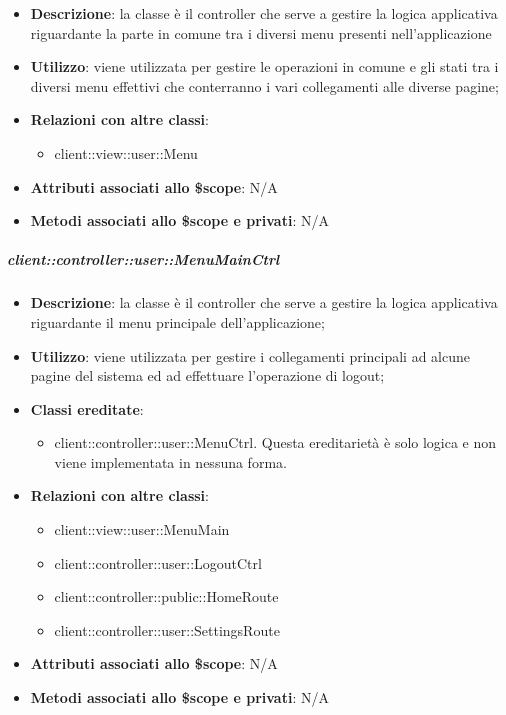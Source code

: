 			\begin{itemize}
				\item \textbf{Descrizione}: la classe è il controller che serve a gestire la logica applicativa riguardante la parte in comune tra i diversi menu presenti nell'applicazione
				\item \textbf{Utilizzo}: viene utilizzata per gestire le operazioni in comune e gli stati tra i diversi menu effettivi che conterranno i vari collegamenti alle diverse pagine;
				\item \textbf{Relazioni con altre classi}:
					\begin{itemize}
						\item client::view::user::Menu
					\end{itemize}
				\item \textbf{Attributi associati allo \$scope}: N/A
				\item \textbf{Metodi associati allo \$scope e privati}: N/A
			\end{itemize}

		\subparagraph{client::controller::user::MenuMainCtrl} %
		\label{subp:client_controller_user_menumainctrl}

			\begin{itemize}
				\item \textbf{Descrizione}: la classe è il controller che serve a gestire la logica applicativa riguardante il menu principale dell'applicazione;
				\item \textbf{Utilizzo}: viene utilizzata per gestire i collegamenti principali ad alcune pagine del sistema ed ad effettuare l'operazione di logout;
				\item \textbf{Classi ereditate}:
					\begin{itemize}
						\item client::controller::user::MenuCtrl. Questa ereditarietà è solo logica e non viene implementata in nessuna forma.
					\end{itemize}
				\item \textbf{Relazioni con altre classi}:
					\begin{itemize}
						\item client::view::user::MenuMain
						\item client::controller::user::LogoutCtrl
						\item client::controller::public::HomeRoute
						\item client::controller::user::SettingsRoute
					\end{itemize}
				\item \textbf{Attributi associati allo \$scope}: N/A
				\item \textbf{Metodi associati allo \$scope e privati}: N/A
			\end{itemize}


